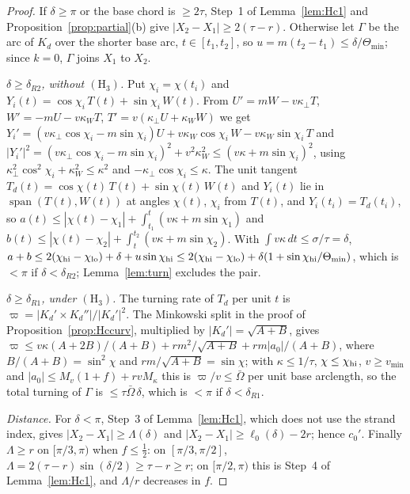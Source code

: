 \documentclass[10pt,a4paper]{article}
\theoremstyle{plain}
\theoremstyle{definition}
\theoremstyle{remark}
\begin{document}
\begin{proof}
If $\delta\ge\pi$ or the base chord is $\ge2\tau$, Step~1 of Lemma~\ref{lem:Hc1} and Proposition~\ref{prop:partial}(b) give $|X_2-X_1|\ge2(\tau-r)$. Otherwise let $\Gamma$ be the arc of $K_d$ over the shorter base arc, $t\in[t_1,t_2]$, so $u=m(t_2-t_1)\le\delta/\Theta_{\min}$; since $k=0$, $\Gamma$ joins $X_1$ to $X_2$.

\emph{$\delta\ge\delta_{R2}$, without $(\mathrm H_3)$.} Put $\chi_i=\chi(t_i)$ and $Y_i(t)=\cos\chi_i\,T(t)+\sin\chi_i\,W(t)$. From $U'=mW-v\kappa_\perp T$, $W'=-mU-v\kappa_WT$, $T'=v(\kappa_\perp U+\kappa_WW)$ we get $Y_i'=(v\kappa_\perp\cos\chi_i-m\sin\chi_i)U+v\kappa_W\cos\chi_i\,W-v\kappa_W\sin\chi_i\,T$ and $|Y_i'|^2=(v\kappa_\perp\cos\chi_i-m\sin\chi_i)^2+v^2\kappa_W^2\le(v\kappa+m\sin\chi_i)^2$, using $\kappa_\perp^2\cos^2\chi_i+\kappa_W^2\le\kappa^2$ and $-\kappa_\perp\cos\chi_i\le\kappa$. The unit tangent $T_d(t)=\cos\chi(t)\,T(t)+\sin\chi(t)\,W(t)$ and $Y_i(t)$ lie in $\operatorname{span}(T(t),W(t))$ at angles $\chi(t)$, $\chi_i$ from $T(t)$, and $Y_i(t_i)=T_d(t_i)$, so $a(t)\le|\chi(t)-\chi_1|+\int_{t_1}^{t}(v\kappa+m\sin\chi_1)$ and $b(t)\le|\chi(t)-\chi_2|+\int_{t}^{t_2}(v\kappa+m\sin\chi_2)$. With $\int v\kappa\,dt\le\sigma/\tau=\delta$, $a+b\le2(\chi_{\rm hi}-\chi_{\rm lo})+\delta+u\sin\chi_{\rm hi}\le2(\chi_{\rm hi}-\chi_{\rm lo})+\delta(1+\sin\chi_{\rm hi}/\Theta_{\min})$, which is $<\pi$ if $\delta<\delta_{R2}$; Lemma~\ref{lem:turn} excludes the pair.

\emph{$\delta\ge\delta_{R1}$, under $(\mathrm H_3)$.} The turning rate of $T_d$ per unit $t$ is $\varpi=|K_d'\times K_d''|/|K_d'|^2$. The Minkowski split in the proof of Proposition~\ref{prop:Hccurv}, multiplied by $|K_d'|=\sqrt{A+B}$, gives $\varpi\le v\kappa(A+2B)/(A+B)+rm^2/\sqrt{A+B}+rm|a_0|/(A+B)$, where $B/(A+B)=\sin^2\chi$ and $rm/\sqrt{A+B}=\sin\chi$; with $\kappa\le1/\tau$, $\chi\le\chi_{\rm hi}$, $v\ge v_{\min}$ and $|a_0|\le M_v(1+f)+rvM_\kappa$ this is $\varpi/v\le\bar\Omega$ per unit base arclength, so the total turning of $\Gamma$ is $\le\tau\bar\Omega\,\delta$, which is $<\pi$ if $\delta<\delta_{R1}$.

\emph{Distance.} For $\delta<\pi$, Step~3 of Lemma~\ref{lem:Hc1}, which does not use the strand index, gives $|X_2-X_1|\ge\Lambda(\delta)$ and $|X_2-X_1|\ge\ell_0(\delta)-2r$; hence $c_0'$. Finally $\Lambda\ge r$ on $[\pi/3,\pi)$ when $f\le\frac12$: on $[\pi/3,\pi/2]$, $\Lambda=2(\tau-r)\sin(\delta/2)\ge\tau-r\ge r$; on $[\pi/2,\pi)$ this is Step~4 of Lemma~\ref{lem:Hc1}, and $\Lambda/r$ decreases in $f$.
\end{proof}
\end{document}
